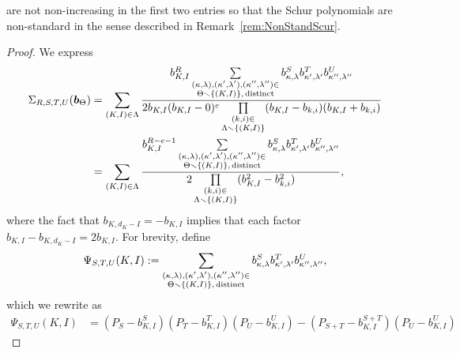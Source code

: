 \documentclass{amsart}
\theoremstyle{definition}
\theoremstyle{remark}
\newcommand{\bs}{\boldsymbol}
\begin{document}
are not non-increasing in the first two entries so that the Schur polynomials are non-standard in the
sense described in Remark~\ref{rem:NonStandScur}.
\begin{proof}
We express
\begin{align*}
    \Sigma_{R,S,T,U}(\bs{b}_\Theta)
    &=
    \sum\limits_{(K,I) \in \Lambda}
        \frac{b_{K,I}^{R}
            \sum\limits_{\substack{(\kappa,\lambda),(\kappa^\prime,\lambda^\prime),
                (\kappa^{\prime\prime},\lambda^{\prime\prime})\in \\
                \Theta\smallsetminus \{(K,I)\},\,
                \mbox{\scriptsize distinct}}}
                    b_{\kappa,\lambda}^S b_{\kappa^\prime,\lambda^\prime}^T
                    b_{\kappa^{\prime\prime},\lambda^{\prime\prime}}^U }
                {2b_{K,I} (b_{K,I} - 0)^e \prod\limits_{\substack{(k,i)\in \\ \Lambda\smallsetminus \{(K,I)\} }}
                    (b_{K,I} - b_{k,i})(b_{K,I} + b_{k,i}) }
    \\&=
    \sum\limits_{(K,I) \in \Lambda}
        \frac{b_{K,I}^{R-e-1}
            \sum\limits_{\substack{(\kappa,\lambda),(\kappa^\prime,\lambda^\prime),
                (\kappa^{\prime\prime},\lambda^{\prime\prime})\in \\
                \Theta\smallsetminus \{(K,I)\},\,
                \mbox{\scriptsize distinct}}}
                    b_{\kappa,\lambda}^S b_{\kappa^\prime,\lambda^\prime}^T
                    b_{\kappa^{\prime\prime},\lambda^{\prime\prime}}^U }
                {2\prod\limits_{\substack{(k,i)\in \\ \Lambda\smallsetminus \{(K,I)\} }}
                    (b_{K,I}^2 - b_{k,i}^2) },
\end{align*}
where the fact that $b_{K,d_K - I} = -b_{K,I}$ implies that each factor $b_{K,I} - b_{K,d_K - I} = 2b_{K,I}$.
For brevity, define
\[
    \Psi_{S,T,U}(K,I)   :=
        \sum\limits_{\substack{(\kappa,\lambda),(\kappa^\prime,\lambda^\prime),
            (\kappa^{\prime\prime},\lambda^{\prime\prime})\in \\
            \Theta\smallsetminus \{(K,I)\},\,
            \mbox{\scriptsize distinct}}}
         b_{\kappa,\lambda}^S b_{\kappa^\prime,\lambda^\prime}^T
         b_{\kappa^{\prime\prime},\lambda^{\prime\prime}}^U,
\]
which we rewrite as
\begin{align}
    \nonumber
    \Psi_{S,T,U}(K,I)
    &=  (P_S - b_{K,I}^S)(P_T - b_{K,I}^T)(P_U - b_{K,I}^U)
            - (P_{S+T} - b_{K,I}^{S+T})(P_U - b_{K,I}^U)

\end{align}
\end{proof}
\end{document}
